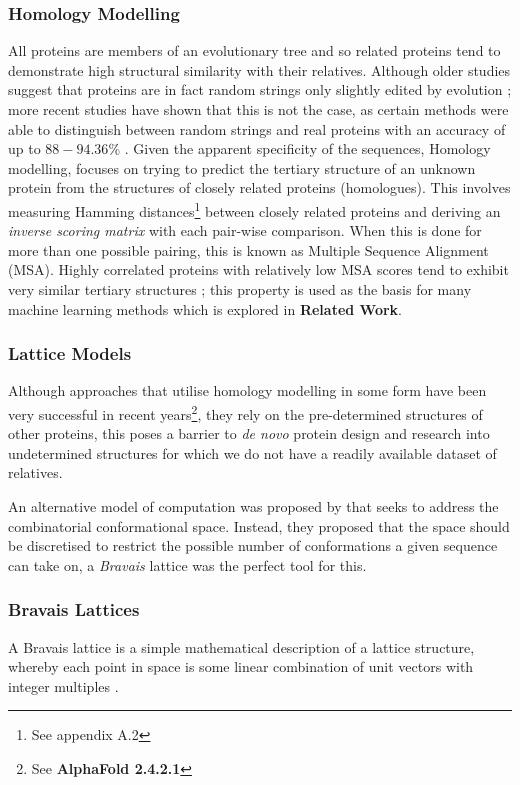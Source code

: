 \subsubsection{Homology Modelling}
All proteins are members of an evolutionary tree and so related
proteins tend to demonstrate high structural similarity with their relatives.
Although older studies suggest that proteins are in fact random strings
only slightly edited by evolution \cite{weiss}; more recent studies
have shown that this is not the case, as certain methods
were able to distinguish between random strings and real proteins
with an accuracy of up to $88-94.36\%$ \cite{delucrezia,Tsygvintsev}.
Given the apparent specificity of the sequences,
Homology modelling, focuses on trying to predict 
the tertiary structure of an unknown protein
from the structures of closely related proteins (homologues).
This involves measuring Hamming distances\footnote{See appendix A.2} 
between closely related proteins and deriving an \emph{inverse scoring matrix}
with each pair-wise comparison. When this is done for more than
one possible pairing, this is known as Multiple Sequence Alignment (MSA).
Highly correlated proteins with relatively low MSA scores tend to exhibit
very similar tertiary structures \cite{lesk}; this property is used as the basis for many
machine learning methods which is explored in \textbf{Related Work}. 
\subsubsection{Lattice Models}
Although approaches that utilise homology modelling in some form
have been very successful in recent years\footnote{See \textbf{AlphaFold 2.4.2.1}},
they rely on the pre-determined structures of other proteins, this poses
a barrier to \emph{de novo} protein design and research into undetermined structures
for which we do not have a readily available dataset of relatives.

An alternative model of computation was proposed by \cite{Yue} that seeks to
address the combinatorial conformational space. Instead, they proposed
that the space should be discretised to restrict the possible number of conformations
a given sequence can take on, a \emph{Bravais} lattice was the perfect tool for this.
\subsubsection{Bravais Lattices}
A Bravais lattice is a simple mathematical description of a lattice structure, whereby
each point in space is some linear combination of unit vectors with integer multiples \cite{kittel}. 

